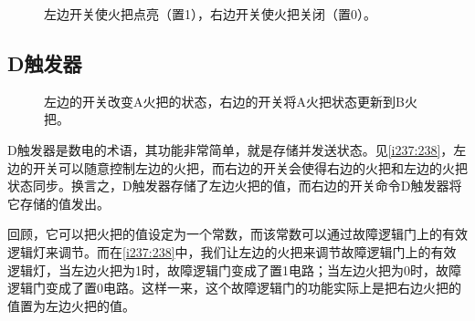 \begin{figure}[!ht]
\begin{center}
\end{center}
\caption{左边开关使火把点亮（置1），右边开关使火把关闭（置0）。}
\label{i59:60}
\end{figure}

\subsection{D触发器}\label{sec15}

\begin{figure}[!ht]
\begin{center}
\qquad
{}
\end{center}
\caption{左边的开关改变A火把的状态，右边的开关将A火把状态更新到B火把。}
\label{i237:238}
\end{figure}

D触发器是数电的术语，其功能非常简单，就是存储并发送状态。见\autoref{i237:238}，左边的开关可以随意控制左边的火把，而右边的开关会使得右边的火把和左边的火把状态同步。换言之，D触发器存储了左边火把的值，而右边的开关命令D触发器将它存储的值发出。

回顾，它可以把火把的值设定为一个常数，而该常数可以通过故障逻辑门上的有效逻辑灯来调节。而在\autoref{i237:238}中，我们让左边的火把来调节故障逻辑门上的有效逻辑灯，当左边火把为1时，故障逻辑门变成了置1电路；当左边火把为0时，故障逻辑门变成了置0电路。这样一来，这个故障逻辑门的功能实际上是把右边火把的值置为左边火把的值。

